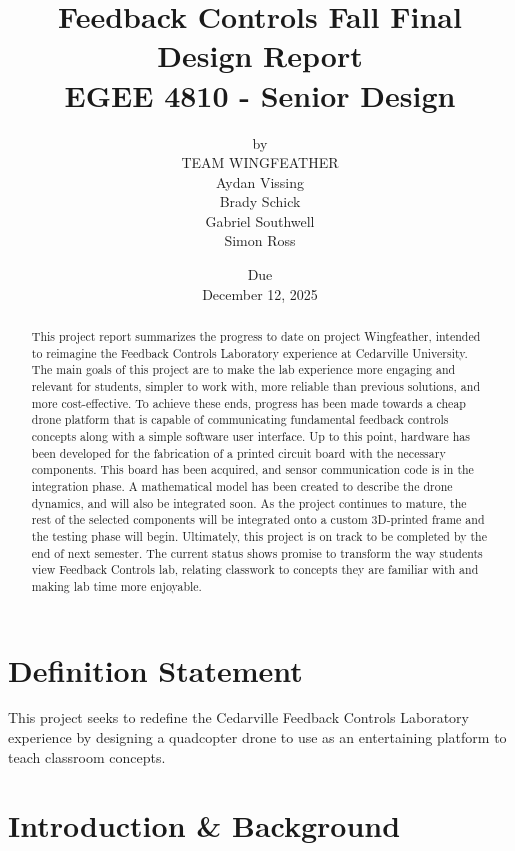 \documentclass[12pt, titlepage]{article}
\title{\Huge Feedback Controls Fall Final Design Report \\ \normalsize{EGEE 4810 - Senior Design}}
\author{by \\ \Large TEAM WINGFEATHER \\ Aydan Vissing \\ Brady Schick \\ Gabriel Southwell \\ Simon Ross}
\date{\footnotesize{Due} \\ \normalsize{December 12, 2025}}
\begin{document}
\maketitle


\begin{abstract}
This project report summarizes the progress to date on project Wingfeather, intended to reimagine the Feedback Controls Laboratory experience at Cedarville University. The main goals of this project are to make the lab experience more engaging and relevant for students, simpler to work with, more reliable than previous solutions, and more cost-effective. To achieve these ends, progress has been made towards a cheap drone platform that is capable of communicating fundamental feedback controls concepts along with a simple software user interface. Up to this point, hardware has been developed for the fabrication of a printed circuit board with the necessary components. This board has been acquired, and sensor communication code is in the integration phase. A mathematical model has been created to describe the drone dynamics, and will also be integrated soon. As the project continues to mature, the rest of the selected components will be integrated onto a custom 3D-printed frame and the testing phase will begin. Ultimately, this project is on track to be completed by the end of next semester. The current status shows promise to transform the way students view Feedback Controls lab, relating classwork to concepts they are familiar with and making lab time more enjoyable.


\end{abstract}

\newpage
\tableofcontents

\newpage
\section{Definition Statement}

This project seeks to redefine the Cedarville Feedback Controls Laboratory experience by designing a quadcopter drone to use as an entertaining platform to teach classroom concepts. 

\section{Introduction \& Background}
\end{document}
